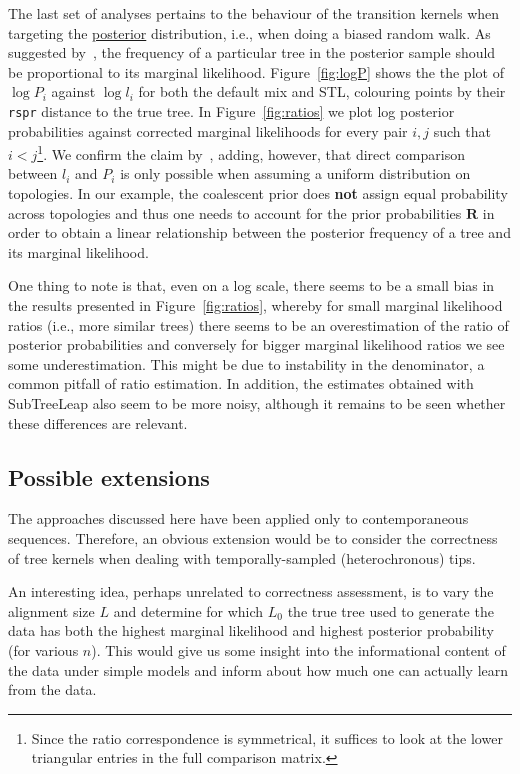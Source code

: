 The last set of analyses pertains to the behaviour of the transition kernels when targeting the \underline{posterior} distribution, i.e., when doing a biased random walk.
As suggested by~\cite{Hoehna2008}, the frequency of a particular tree in the posterior sample should be proportional to its marginal likelihood.
Figure~\ref{fig:logP} shows the the plot of $\log P_i$ against $\log l_i$ for both the default mix and STL, colouring points by their \verb|rspr| distance to the true tree.
In Figure~\ref{fig:ratios} we plot log posterior probabilities against corrected marginal likelihoods for every pair $i, j$ such that $i < j$\footnote{Since the ratio correspondence is symmetrical, it suffices to look at the lower triangular entries in the full comparison matrix.}.
We confirm the claim by~\cite{Hoehna2008}, adding, however, that direct comparison between $l_i$ and $P_i$ is only possible when assuming a uniform distribution on topologies.
In our example, the coalescent prior does \textbf{not} assign equal probability across topologies and thus one needs to account for the prior probabilities $\boldsymbol R$ in order to obtain a linear relationship between the posterior frequency of a tree and its marginal likelihood.

One thing to note is that, even on  a log scale, there seems to be a small bias in the results presented in Figure~\ref{fig:ratios}, whereby for small marginal likelihood ratios (i.e., more similar trees) there seems to be an overestimation of the ratio of posterior probabilities and conversely for bigger marginal likelihood ratios we see some underestimation.
This might be due to instability in the denominator, a common pitfall of ratio estimation.
In addition, the estimates obtained with SubTreeLeap also seem to be more noisy, although it remains to be seen whether these differences are relevant.

\subsection*{Possible extensions}

The approaches discussed here have been applied only to contemporaneous sequences.
Therefore, an obvious extension would be to consider the correctness of tree kernels when dealing with temporally-sampled (heterochronous) tips.

An interesting idea, perhaps unrelated to correctness assessment, is to vary the alignment size $L$ and determine for which $L_0$ the true tree used to generate the data has both the highest marginal likelihood and highest posterior probability (for various $n$).
This would give us some insight into the informational content of the data under simple models and inform about how much one can actually learn from the data.

